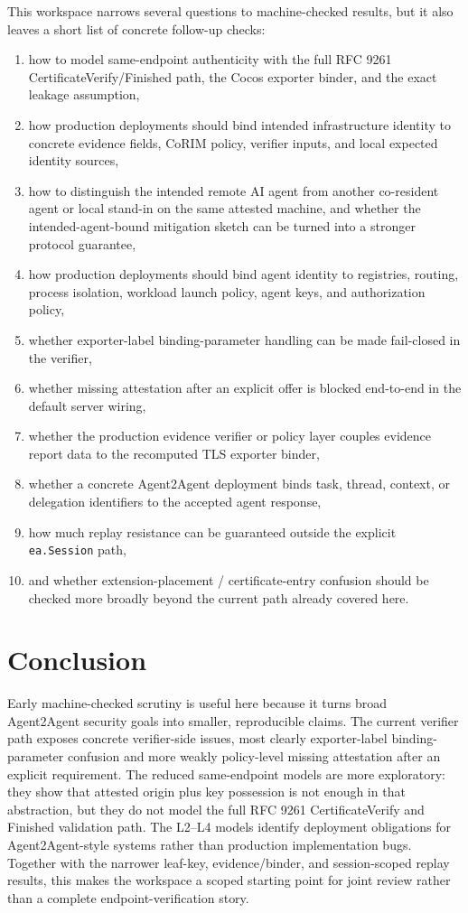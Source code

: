 \documentclass[11pt,a4paper]{article}
\begin{document}
This workspace narrows several questions to machine-checked results, but it
also leaves a short list of concrete follow-up checks:

\begin{enumerate}
\item how to model same-endpoint authenticity with the full RFC 9261
CertificateVerify/Finished path, the Cocos exporter binder, and the exact
leakage assumption,
\item how production deployments should bind intended infrastructure identity
to concrete evidence fields, CoRIM policy, verifier inputs, and local expected
identity sources,
\item how to distinguish the intended remote AI agent from another
co-resident agent or local stand-in on the same attested machine, and whether
the intended-agent-bound mitigation sketch can be turned into a stronger
protocol guarantee,
\item how production deployments should bind agent identity to registries,
routing, process isolation, workload launch policy, agent keys, and
authorization policy,
\item whether exporter-label binding-parameter handling can be made fail-closed
in the verifier,
\item whether missing attestation after an explicit offer is blocked
end-to-end in the default server wiring,
\item whether the production evidence verifier or policy layer couples
evidence report data to the recomputed TLS exporter binder,
\item whether a concrete Agent2Agent deployment binds task, thread, context, or
delegation identifiers to the accepted agent response,
\item how much replay resistance can be guaranteed outside the explicit
\texttt{ea.Session} path,
\item and whether extension-placement / certificate-entry confusion should be
checked more broadly beyond the current path already covered here.
\end{enumerate}

\section{Conclusion}

Early machine-checked scrutiny is useful here because it turns broad
Agent2Agent security goals into smaller, reproducible claims. The current
verifier path exposes concrete verifier-side issues, most clearly
exporter-label binding-parameter confusion and more weakly policy-level
missing attestation after an explicit requirement. The reduced same-endpoint
models are more exploratory: they show that attested origin plus key
possession is not enough in that abstraction, but they do not model the full
RFC 9261 CertificateVerify and Finished validation path. The L2--L4 models
identify deployment obligations for Agent2Agent-style systems rather than
production implementation bugs. Together with the narrower leaf-key,
evidence/binder, and session-scoped replay results, this makes the workspace a
scoped starting point for joint review rather than a complete
endpoint-verification story.
\end{document}
